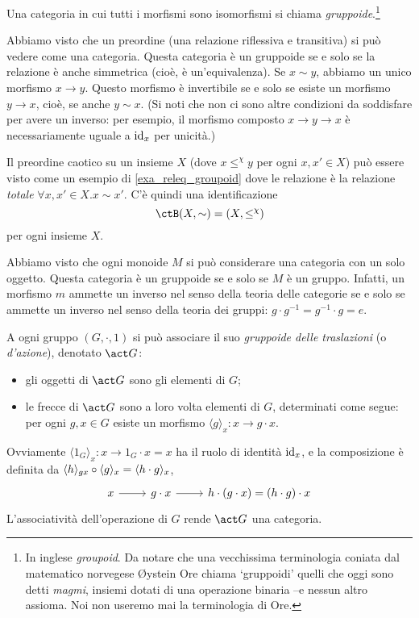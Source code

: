 \begin{definition}[Gruppoide]\label{def_gruppoide}
	Una categoria in cui tutti i morfismi sono isomorfismi si chiama \emph{gruppoide}.\footnote{In inglese \emph{groupoid}. Da notare che una vecchissima terminologia coniata dal matematico norvegese Øystein Ore chiama `gruppoidi' quelli che oggi sono detti \emph{magmi}, insiemi dotati di una operazione binaria --e nessun altro assioma. Noi non useremo mai la terminologia di Ore.}
\end{definition}
\begin{example}\label{exa_releq_groupoid}
	Abbiamo visto che un preordine (una relazione riflessiva e transitiva) si può vedere come una categoria. Questa categoria è un gruppoide se e solo se la relazione è anche simmetrica (cioè, è un'equivalenza). Se \(x\sim y\), abbiamo un unico morfismo \(x\to y\). Questo morfismo è invertibile se e solo se esiste un morfismo \(y\to x\), cioè, se anche \(y\sim x\). (Si noti che non ci sono altre condizioni da soddisfare per avere un inverso: per esempio, il morfismo composto \(x\to y\to x\) è necessariamente uguale a \(\mathrm{id}_x\) per unicità.)
\end{example}
\begin{remark}
	Il preordine caotico su un insieme $X$ (dove \(x\mathrel{\le^\chi} y\) per ogni \(x,x'\in X\)) può essere visto come un esempio di \ref{exa_releq_groupoid} dove le relazione è la relazione \emph{totale} $\forall x,x'\in X.x\sim x'$. C'è quindi una identificazione
	\[\ctB(X,\sim) = (X,\le^\chi)\]
	per ogni insieme $X$.
\end{remark}
\begin{example}\label{exa_grp_groupoid}
	Abbiamo visto che ogni monoide \(M\) si può considerare una categoria con un solo oggetto. Questa categoria è un gruppoide se e solo se \(M\) è un gruppo. Infatti, un morfismo \(m\) ammette un inverso nel senso della teoria delle categorie se e solo se ammette un inverso nel senso della teoria dei gruppi: \(g\cdot g^{-1}=g^{-1}\cdot g = e\).
\end{example}
\begin{example}\label{action_groupoid}
	A ogni gruppo $(G,\cdot,1)$ si può associare il suo \emph{gruppoide delle traslazioni} (o \emph{d'azione}), denotato $\act G$: 
	\begin{itemize}
		\item gli oggetti di $\act G$ sono gli elementi di $G$;
		\item le frecce di $\act G$ sono a loro volta elementi di $G$, determinati come segue: per ogni $g,x\in G$ esiste un morfismo $\langle g\rangle_x : x\to g\cdot x$.
	\end{itemize}
	Ovviamente $\langle 1_G\rangle_x : x \to 1_G\cdot x=x$ ha il ruolo di identità $\mathrm{id}_x$, e la composizione è definita da $\langle h\rangle_{gx}\circ \langle g\rangle_x = \langle h\cdot g\rangle_x$,
	\[\begin{tikzcd}
		x \ar[r] & g\cdot x \ar[r] & h\cdot (g\cdot x) = (h\cdot g)\cdot x
	\end{tikzcd}\]
	L'associatività dell'operazione di $G$ rende $\act G$ una categoria.
\end{example}
